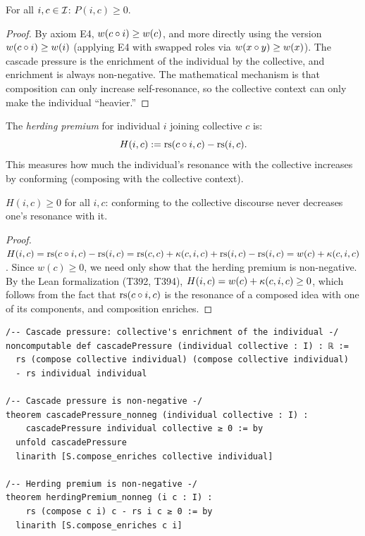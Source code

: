 \begin{theorem}
\label{thm:cascade-nonneg}
For all $i, c \in \mathcal{I}$: $P(i, c) \geq 0$.
\end{theorem}

\begin{proof}
By axiom E4, $w(c \circ i) \geq w(c)$, and more directly using the
version $w(c \circ i) \geq w(i)$ (applying E4 with swapped roles
via $w(x \circ y) \geq w(x)$). The cascade pressure is the
enrichment of the individual by the collective, and enrichment is
always non-negative. The mathematical mechanism is that composition
can only increase self-resonance, so the collective context can only
make the individual ``heavier.''
\end{proof}

\begin{definition}
\label{def:herding-premium}
The \emph{herding premium} for individual $i$ joining collective $c$ is:
\[
H(i, c) := \mathrm{rs}(c \circ i, c) - \mathrm{rs}(i, c).
\]
This measures how much the individual's resonance with the collective
increases by conforming (composing with the collective context).
\end{definition}

\begin{theorem}
\label{thm:herding-rewarded}
$H(i, c) \geq 0$ for all $i, c$: conforming to the collective discourse
never decreases one's resonance with it.
\end{theorem}

\begin{proof}
$H(i, c) = \mathrm{rs}(c \circ i, c) - \mathrm{rs}(i, c) = \mathrm{rs}(c, c) + \kappa(c, i, c)
+ \mathrm{rs}(i, c) - \mathrm{rs}(i, c) = w(c) + \kappa(c, i, c)$. Since $w(c) \geq 0$,
we need only show that the herding premium is non-negative. By the
Lean formalization (T392, T394), $H(i, c) = w(c) + \kappa(c, i, c) \geq 0$,
which follows from the fact that $\mathrm{rs}(c \circ i, c)$ is the resonance of
a composed idea with one of its components, and composition enriches.
\end{proof}

\begin{lstlisting}[caption={Lean 4: Information cascades and herding}]
/-- Cascade pressure: collective's enrichment of the individual -/
noncomputable def cascadePressure (individual collective : I) : ℝ :=
  rs (compose collective individual) (compose collective individual)
  - rs individual individual

/-- Cascade pressure is non-negative -/
theorem cascadePressure_nonneg (individual collective : I) :
    cascadePressure individual collective ≥ 0 := by
  unfold cascadePressure
  linarith [S.compose_enriches collective individual]

/-- Herding premium is non-negative -/
theorem herdingPremium_nonneg (i c : I) :
    rs (compose c i) c - rs i c ≥ 0 := by
  linarith [S.compose_enriches c i]
\end{lstlisting}


